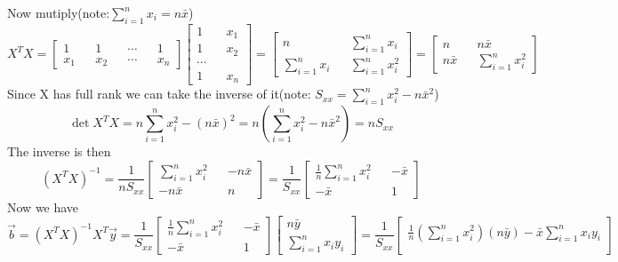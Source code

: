 \documentclass[12pt]{article}
\begin{document}
\begin{enumerate}
Now mutiply(note:$\sum\limits_{i=1}^nx_i=n\bar{x}$) \begin{equation*}X^TX= \begin{bmatrix}1 && 1 && \cdots && 1\\x_1 && x_2 && \cdots && x_n\end{bmatrix}
\begin{bmatrix}1 && x_1\\1 && x_2\\\cdots\\1 && x_n\end{bmatrix} = 
\begin{bmatrix}n && \sum\limits_{i=1}^nx_i\\\sum\limits_{i=1}^nx_i && \sum\limits_{i=1}^nx_i^2\end{bmatrix}=
\begin{bmatrix}n &&n\bar{x}\\n\bar{x}&&\sum\limits_{i=1}^nx_i^2\end{bmatrix}\end{equation*}
Since X has full rank we can take the inverse of it(note: $S_{xx}=\sum\limits_{i=1}^nx_i^2-n\bar{x}^2$)\begin{equation*}
\det{X^TX}=n\sum\limits_{i=1}^nx_i^2-(n\bar{x})^2=n(\sum\limits_{i=1}^nx_i^2-n\bar{x}^2)=nS_{xx}\end{equation*}
The inverse is then \begin{equation*}
(X^TX)^{-1}=\frac{1}{nS_{xx}}\begin{bmatrix}
\sum\limits_{i=1}^nx_i^2&&-n\bar{x}\\
-n\bar{x}&&n
\end{bmatrix}=\frac{1}{S_{xx}}\begin{bmatrix}
\frac{1}{n}\sum\limits_{i=1}^nx_i^2&&-\bar{x}\\
-\bar{x}&&1\end{bmatrix}\end{equation*}
Now we have  \begin{equation*}
\vec{b}=(X^TX)^{-1}X^T\vec{y}=\frac{1}{S_{xx}}\begin{bmatrix}
\frac{1}{n}\sum\limits_{i=1}^nx_i^2&&-\bar{x}\\
-\bar{x}&&1
\end{bmatrix}\begin{bmatrix}n\bar{y}\\\sum\limits_{i=1}^nx_iy_i \end{bmatrix}=
\frac{1}{S_{xx}}\begin{bmatrix}
\frac{1}{n}(\sum\limits_{i=1}^nx_i^2)(n\bar{y})-\bar{x}\sum\limits_{i=1}^nx_iy_i\\

\end{bmatrix}
\end{equation*}
\end{enumerate}
\end{document}
